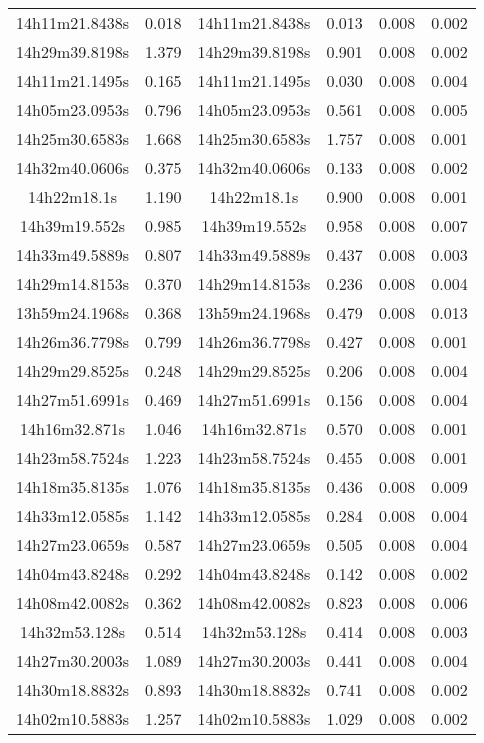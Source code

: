 \begin{table}
\begin{tabular}{cccccc}
14h11m21.8438s & 0.018 & 14h11m21.8438s & 0.013 & 0.008 & 0.002 \\
14h29m39.8198s & 1.379 & 14h29m39.8198s & 0.901 & 0.008 & 0.002 \\
14h11m21.1495s & 0.165 & 14h11m21.1495s & 0.030 & 0.008 & 0.004 \\
14h05m23.0953s & 0.796 & 14h05m23.0953s & 0.561 & 0.008 & 0.005 \\
14h25m30.6583s & 1.668 & 14h25m30.6583s & 1.757 & 0.008 & 0.001 \\
14h32m40.0606s & 0.375 & 14h32m40.0606s & 0.133 & 0.008 & 0.002 \\
14h22m18.1s & 1.190 & 14h22m18.1s & 0.900 & 0.008 & 0.001 \\
14h39m19.552s & 0.985 & 14h39m19.552s & 0.958 & 0.008 & 0.007 \\
14h33m49.5889s & 0.807 & 14h33m49.5889s & 0.437 & 0.008 & 0.003 \\
14h29m14.8153s & 0.370 & 14h29m14.8153s & 0.236 & 0.008 & 0.004 \\
13h59m24.1968s & 0.368 & 13h59m24.1968s & 0.479 & 0.008 & 0.013 \\
14h26m36.7798s & 0.799 & 14h26m36.7798s & 0.427 & 0.008 & 0.001 \\
14h29m29.8525s & 0.248 & 14h29m29.8525s & 0.206 & 0.008 & 0.004 \\
14h27m51.6991s & 0.469 & 14h27m51.6991s & 0.156 & 0.008 & 0.004 \\
14h16m32.871s & 1.046 & 14h16m32.871s & 0.570 & 0.008 & 0.001 \\
14h23m58.7524s & 1.223 & 14h23m58.7524s & 0.455 & 0.008 & 0.001 \\
14h18m35.8135s & 1.076 & 14h18m35.8135s & 0.436 & 0.008 & 0.009 \\
14h33m12.0585s & 1.142 & 14h33m12.0585s & 0.284 & 0.008 & 0.004 \\
14h27m23.0659s & 0.587 & 14h27m23.0659s & 0.505 & 0.008 & 0.004 \\
14h04m43.8248s & 0.292 & 14h04m43.8248s & 0.142 & 0.008 & 0.002 \\
14h08m42.0082s & 0.362 & 14h08m42.0082s & 0.823 & 0.008 & 0.006 \\
14h32m53.128s & 0.514 & 14h32m53.128s & 0.414 & 0.008 & 0.003 \\
14h27m30.2003s & 1.089 & 14h27m30.2003s & 0.441 & 0.008 & 0.004 \\
14h30m18.8832s & 0.893 & 14h30m18.8832s & 0.741 & 0.008 & 0.002 \\
14h02m10.5883s & 1.257 & 14h02m10.5883s & 1.029 & 0.008 & 0.002 \\

\end{tabular}
\end{table}
